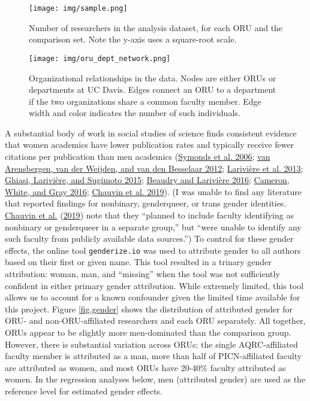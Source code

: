\documentclass[
  11pt,
]{article}
\begin{document}
\begin{figure}
\centering
\texttt{[image: img/sample.png]}
\caption{Number of researchers in the analysis dataset, for each ORU and the comparison set. Note the y-axis uses a square-root scale. \label{fig.sample}}
\end{figure}

\begin{figure}
\centering
\texttt{[image: img/oru\_dept\_network.png]}
\caption{Organizational relationships in the data. Nodes are either ORUs or departments at UC Davis. Edges connect an ORU to a department if the two organizations share a common faculty member. Edge width and color indicates the number of such individuals. \label{fig.org_net}}
\end{figure}

A substantial body of work in social studies of science finds consistent evidence that women academics have lower publication rates and typically receive fewer citations per publication than men academics (\protect\hyperlink{ref-SymondsGenderDifferencesPublication2006}{Symonds et al. 2006}; \protect\hyperlink{ref-vanArensbergenGenderDifferencesScientific2012}{van Arensbergen, van der Weijden, and van den Besselaar 2012}; \protect\hyperlink{ref-LariviereBibliometricsGlobalGender2013}{Larivière et al. 2013}; \protect\hyperlink{ref-GhiasiComplianceWomenEngineers2015}{Ghiasi, Larivière, and Sugimoto 2015}; \protect\hyperlink{ref-BeaudryWhichGenderGap2016}{Beaudry and Larivière 2016}; \protect\hyperlink{ref-CameronSolvingProductivityImpact2016}{Cameron, White, and Gray 2016}; \protect\hyperlink{ref-ChauvinGenderDifferencesResearch2019}{Chauvin et al. 2019}). (I was unable to find any literature that reported findings for nonbinary, genderqueer, or trans gender identities. \protect\hyperlink{ref-ChauvinGenderDifferencesResearch2019}{Chauvin et al.} (\protect\hyperlink{ref-ChauvinGenderDifferencesResearch2019}{2019}) note that they ``planned to include faculty identifying as nonbinary or genderqueer in a separate group,'' but ``were unable to identify any such faculty from publicly available data sources.'') To control for these gender effects, the online tool \texttt{genderize.io} was used to attribute gender to all authors based on their first or given name. This tool resulted in a trinary gender attribution: woman, man, and ``missing'' when the tool was not sufficiently confident in either primary gender attribution. While extremely limited, this tool allows us to account for a known confounder given the limited time available for this project. Figure \ref{fig.gender} shows the distribution of attributed gender for ORU- and non-ORU-affiliated researchers and each ORU separately. All together, ORUs appear to be slightly more men-dominated than the comparison group. However, there is substantial variation across ORUs; the single AQRC-affiliated faculty member is attributed as a man, more than half of PICN-affiliated faculty are attributed as women, and most ORUs have 20-40\% faculty attributed as women. In the regression analyses below, men (attributed gender) are used as the reference level for estimated gender effects.
\end{document}
